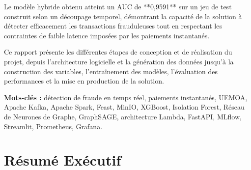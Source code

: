 \documentclass[12pt,a4paper,oneside]{book}
\theoremstyle{definition}
\theoremstyle{plain}
\begin{document}
Le modèle hybride obtenu atteint un AUC de **0,9591** sur un jeu de test construit selon un découpage temporel, démontrant la capacité de la solution à détecter efficacement les transactions frauduleuses tout en respectant les contraintes de faible latence imposées par les paiements instantanés.

Ce rapport présente les différentes étapes de conception et de réalisation du projet, depuis l'architecture logicielle et la génération des données jusqu'à la construction des variables, l'entraînement des modèles, l'évaluation des performances et la mise en production de la solution.

\vspace{0.5cm}
\noindent\textbf{Mots-clés :} détection de fraude en temps réel, paiements instantanés, UEMOA, Apache Kafka, Apache Spark, Feast, MinIO, XGBoost, Isolation Forest, Réseau de Neurones de Graphe, GraphSAGE, architecture Lambda, FastAPI, MLflow, Streamlit, Prometheus, Grafana.

\cleardoublepage

\chapter*{Résumé Exécutif}
\end{document}
